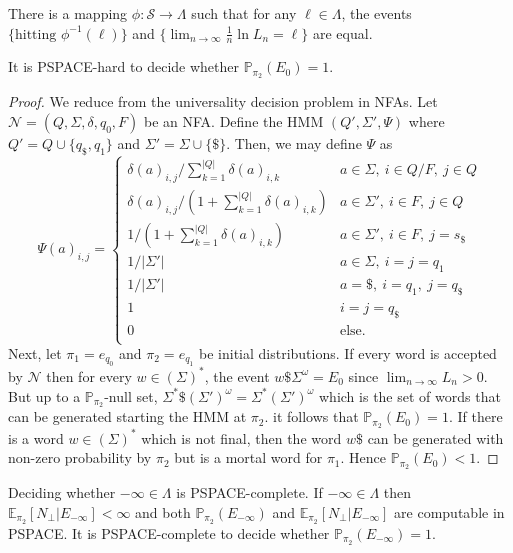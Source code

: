 \documentclass[a4paper,UKenglish,cleveref, autoref,mathscr]{lipics-v2019}
\newcommand{\EE}{\mathbb{E}}
\newcommand{\PP}{\mathbb{P}}
\newcommand{\1}{\mathbbm{1}}
\newcommand{\liexp}{\lim_{n\rightarrow\infty} \frac1n \ln L_n}
\begin{document}
\begin{lemma}
There is a mapping $\phi : \mathcal{S} \rightarrow \Lambda$ such that for any $\ell \in \Lambda$, the events $\big\{\text{hitting } \phi^{-1}(\ell)\big\}$ and $\{\liexp = \ell\}$ are equal.
\end{lemma}

\begin{lemma}
It is PSPACE-hard to decide whether $\PP_{\pi_2}(E_0) = 1$.
\end{lemma}

\begin{proof}
We reduce from the universality decision problem in NFAs. Let $\mathcal{N} = (Q, \Sigma, \delta, q_0, F)$ be an NFA. Define the HMM $(Q', \Sigma', \Psi)$ where $Q' = Q \cup \{q_\$, q_1\}$ and $\Sigma' = \Sigma \cup \{\$\}$. Then, we may define $\Psi$ as
\begin{equation*}
\Psi(a)_{i,j} = \begin{cases}
\delta(a)_{i,j} / \sum_{k = 1}^{|Q|} \delta(a)_{i,k} & a \in \Sigma,~ i \in Q/F,~ j \in Q \\
\delta(a)_{i,j} / (1 + \sum_{k = 1}^{|Q|} \delta(a)_{i,k}) & a \in \Sigma',~ i \in F,~ j \in Q\\
1 / (1 + \sum_{k = 1}^{|Q|} \delta(a)_{i,k}) & a \in \Sigma',~ i \in F,~ j = s_\$\\
1/|\Sigma'| & a \in \Sigma,~ i = j = q_1 \\
1/|\Sigma'| & a = \$,~ i = q_1,~ j = q_\$ \\
1 & i = j = q_\$\\
0 & \text{else}.\\
\end{cases}
\end{equation*}
Next, let $\pi_1 = e_{q_0}$ and $\pi_2 = e_{q_1}$ be initial distributions. If every word is accepted by $\mathcal{N}$ then for every $w \in (\Sigma)^*$, the event $w\$ \Sigma^\omega = E_0$ since $\lim_{n\rightarrow\infty} L_n > 0$. But up to a $\PP_{\pi_2}$-null set, $\Sigma^* \$ (\Sigma')^\omega = \Sigma^*(\Sigma')^\omega$ which is the set of words that can be generated starting the HMM at $\pi_2$. it follows that $\PP_{\pi_2}(E_0) = 1$. If there is a word $w \in (\Sigma)^*$ which is not final, then the word $w \$$ can be generated with non-zero probability by $\pi_2$ but is a mortal word for $\pi_1$. Hence $\PP_{\pi_2}(E_0) < 1$.
\end{proof}




\begin{proposition}
Deciding whether $-\infty \in \Lambda$ is PSPACE-complete. If $-\infty \in \Lambda$ then $\EE_{\pi_2}[N_\perp | E_{-\infty}] < \infty$ and both $\PP_{\pi_2}(E_{-\infty})$ and $\EE_{\pi_2}[N_\perp | E_{-\infty}]$ are computable in PSPACE. It is PSPACE-complete to decide whether $\PP_{\pi_2}(E_{-\infty}) = 1$.
\end{proposition}
\end{document}
